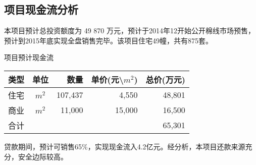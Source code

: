 \subsection{项目现金流分析}
本项目预计总投资额度为 49 870 万元，预计于2014年12开始公开棉线市场预售，预计到2015年底实现全盘销售完毕。该项目住宅49幢，共有875套。
  \begin{center}
  \begin{threeparttable}\vspace{-1.0cm}
 \caption{项目预计现金流}
 \renewcommand{\arraystretch}{1.1} \arrayrulewidth=0.8pt \tabcolsep=8pt
 	 \begin{tabular}{>{\footnotesize}c>{\footnotesize}c>{\footnotesize}r>{\footnotesize}r>{\footnotesize}r}
	\hline\hline
\rowcolor{mycyan}	\bfseries 类型 	& \bfseries 单位   &  \bfseries 数量 \hspace{2ex}      & \bfseries 单价(元\textbackslash $m^2$) & \bfseries 总价(万元)  \\
	\hline \renewcommand{\arraystretch}{1}
住宅	&	$m^2$	& 107,437	&	4,550	&	48,801	\\
商业	&	$m^2$	&	11,000	&	15,000	&	 16,500	\\
\midrule
合计	&		&		&		&	65,301	\\	
	\bottomrule
	\end{tabular}
\end{threeparttable}
\end{center}
\begin{note}
贷款期间，预计可销售65\%，实现现金流入4.2亿元。经分析，本项目还款来源充分，安全边际较高。
\end{note}

























